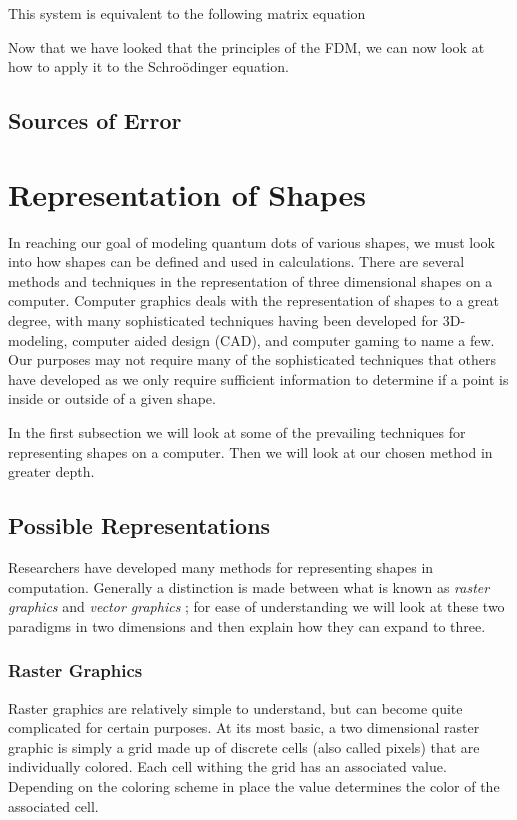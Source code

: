 \documentclass[authoryearcitations]{UoYCSproject}
\begin{document}
This system is equivalent to the following matrix equation



Now that we have looked that the principles of the FDM, we can now look at how to apply it to the Schro\"{o}dinger equation.

\subsection{Sources of Error}

\section{Representation of Shapes}
In reaching our goal of modeling quantum dots of various shapes, we must look into how shapes can be defined and used in 
calculations. There are several methods and techniques in the representation of three dimensional shapes on a computer. 
Computer graphics deals with the representation of shapes to a great degree, with many sophisticated techniques having been 
developed for 3D-modeling, computer aided design (CAD), and computer gaming to name a few. Our purposes may not require
many of the sophisticated techniques that others have developed as we only require sufficient information to determine if
a point is inside or outside of a given shape. 

In the first subsection we will look at some of the prevailing techniques for representing shapes on a computer. Then we will 
look at our chosen method in greater depth. 

\subsection{Possible Representations}
Researchers have developed many methods for representing shapes in computation. Generally a distinction is made between what is 
known as \emph{raster graphics} and \emph{vector graphics} \cite{bors}; for ease of understanding we will look at these two 
paradigms in two dimensions and then explain how they can expand to three. 

\subsubsection{Raster Graphics}
Raster graphics are relatively simple to understand, but can become quite complicated for certain purposes. At its most basic, 
a two dimensional raster graphic is simply a grid made up of discrete cells (also called pixels) that are individually colored.  
Each cell withing the grid has an associated value. Depending on the coloring scheme in place the value determines the 
color of the associated cell. 
\end{document}
